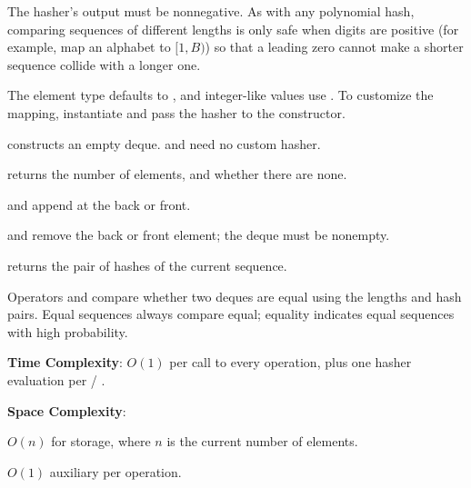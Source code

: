 The hasher's output must be nonnegative. As with any polynomial hash, comparing sequences of different lengths is only safe when digits are positive (for example, map an alphabet to $[1, B)$) so that a leading zero cannot make a shorter sequence collide with a longer one.

The element type defaults to , and integer-like values use . To customize the mapping, instantiate  and pass the hasher to the constructor.

\begin{compactitem}
  \item {} constructs an empty deque.  and  need no custom hasher.
  \item {} returns the number of elements, and  whether there are none.
  \item {} and  append  at the back or front.
  \item {} and  remove the back or front element; the deque must be nonempty.
  \item {} returns the pair of hashes of the current sequence.
  \item Operators \inlinecode{==} and \inlinecode{!=} compare whether two deques are equal using the lengths and hash pairs. Equal sequences always compare equal; equality indicates equal sequences with high probability.
\end{compactitem}

\textbf{Time Complexity}: $O(1)$ per call to every operation, plus one hasher evaluation per  / .

\textbf{Space Complexity}:
\begin{compactitem}
  \item $O(n)$ for storage, where $n$ is the current number of elements.
  \item $O(1)$ auxiliary per operation.
\end{compactitem}

